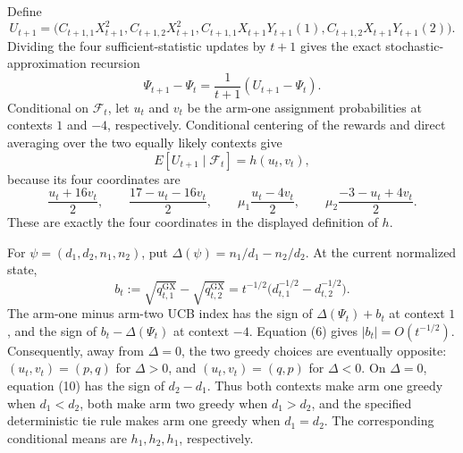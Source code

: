 Define
\[
 U_{t+1}=\bigl(C_{t+1,1}X_{t+1}^2,C_{t+1,2}X_{t+1}^2,
 C_{t+1,1}X_{t+1}Y_{t+1}(1),C_{t+1,2}X_{t+1}Y_{t+1}(2)\bigr).
\]
Dividing the four sufficient-statistic updates by \(t+1\) gives the exact stochastic-approximation recursion
\[
 \Psi_{t+1}-\Psi_t=\frac1{t+1}(U_{t+1}-\Psi_t). \tag{8}
\]
Conditional on \(\mathcal F_t\), let \(u_t\) and \(v_t\) be the arm-one assignment probabilities at contexts \(1\) and \(-4\), respectively.  Conditional centering of the rewards and direct averaging over the two equally likely contexts give
\[
 E[U_{t+1}\mid\mathcal F_t]=h(u_t,v_t), \tag{9}
\]
because its four coordinates are
\[
 \frac{u_t+16v_t}{2},\qquad \frac{17-u_t-16v_t}{2},\qquad
 \mu_1\frac{u_t-4v_t}{2},\qquad
 \mu_2\frac{-3-u_t+4v_t}{2}.
\]
These are exactly the four coordinates in the displayed definition of \(h\).

For \(\psi=(d_1,d_2,n_1,n_2)\), put \(\Delta(\psi)=n_1/d_1-n_2/d_2\).  At the current normalized state,
\[
 b_t:=\sqrt{q^{\mathrm{GX}}_{t,1}}-\sqrt{q^{\mathrm{GX}}_{t,2}}
 =t^{-1/2}\bigl(d_{t,1}^{-1/2}-d_{t,2}^{-1/2}\bigr). \tag{10}
\]
The arm-one minus arm-two UCB index has the sign of \(\Delta(\Psi_t)+b_t\) at context \(1\), and the sign of \(b_t-\Delta(\Psi_t)\) at context \(-4\).  Equation (6) gives \(|b_t|=O(t^{-1/2})\).  Consequently, away from \(\Delta=0\), the two greedy choices are eventually opposite: \((u_t,v_t)=(p,q)\) for \(\Delta>0\), and \((u_t,v_t)=(q,p)\) for \(\Delta<0\).  On \(\Delta=0\), equation (10) has the sign of \(d_2-d_1\).  Thus both contexts make arm one greedy when \(d_1<d_2\), both make arm two greedy when \(d_1>d_2\), and the specified deterministic tie rule makes arm one greedy when \(d_1=d_2\).  The corresponding conditional means are \(h_1,h_2,h_1\), respectively.

